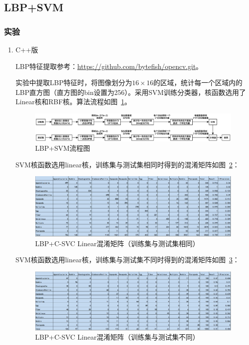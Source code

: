 \documentclass[12pt]{article}
\begin{document}
\subsection{LBP+SVM}

\subsubsection{实验}

\begin{enumerate}

\item C++版

LBP特征提取参考：\url{https://github.com/bytefish/opencv.git}。

实验中提取LBP特征时，将图像划分为$16 \times 16$的区域，统计每一个区域内的LBP直方图（直方图的bin设置为256）。采用SVM训练分类器，核函数选用了Linear核和RBF核。算法流程如图~\ref{fig:lbp}。

\begin{figure}[!ht]
\centering
\includegraphics[width=1.0\linewidth]{lbpChina}
\caption{LBP+SVM流程图}
\label{fig:lbp}
\end{figure}

SVM核函数选用linear核，训练集与测试集相同时得到的混淆矩阵如图~\ref{fig: Train-CM-LBP-SVM-linear}：
\begin{figure}[!ht]
\centering
\includegraphics[width=1.0\linewidth]{Train-CM-LBP-SVM-linear}
\caption{LBP+C-SVC Linear混淆矩阵（训练集与测试集相同）}
\label{fig: Train-CM-LBP-SVM-linear}
\end{figure}

SVM核函数选用linear核，训练集与测试集不同时得到的混淆矩阵如图~\ref{fig: Test-CM-LBP-SVM-linear}：
\begin{figure}[!ht]
\centering
\includegraphics[width=1.0\linewidth]{Test-CM-LBP-SVM-linear}
\caption{LBP+C-SVC Linear混淆矩阵（训练集与测试集不同）}
\label{fig: Test-CM-LBP-SVM-linear}
\end{figure}


\end{enumerate}
\end{document}
